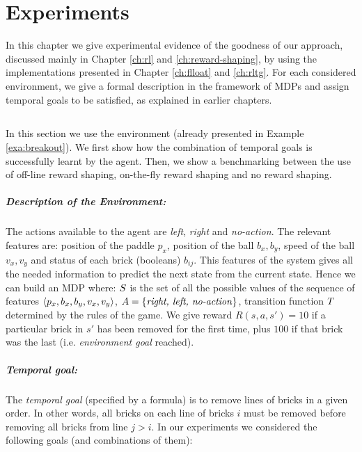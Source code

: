 \chapter{Experiments}\label{ch:experiments}

In this chapter we give experimental evidence of the goodness of our approach, discussed mainly in Chapter \ref{ch:rl} and \ref{ch:reward-shaping}, by using the implementations presented in Chapter \ref{ch:flloat} and \ref{ch:rltg}. For each considered environment, we give a formal description in the framework of MDPs and assign temporal goals to be satisfied, as explained in earlier chapters.
\section{\Breakout}
In this section we use the \Breakout environment (already presented in Example \ref{exa:breakout}). We first show how the combination of temporal goals is successfully learnt by the agent. Then, we show a benchmarking between the use of off-line reward shaping, on-the-fly reward shaping and no reward shaping.
\paragraph{Description of the Environment:}
The actions available to the agent are \emph{left}, \emph{right} and \emph{no-action}. The relevant features are: position of the paddle $p_x$, position of the ball $b_x, b_y$, speed of the ball $v_x, v_y$ and status of each brick (booleans) $b_{ij}$. This features of the system gives all the needed information to predict the next state from the current state. Hence we can build an MDP where: $S$ is the set of  all the possible values of the sequence of features $\langle p_x, b_x, b_y, v_x, v_y \rangle$, $A = \{\text{\emph{right, left, no-action}}\}$, transition function $T$ determined by the rules of the game. We give reward $R(s,a,s')=10$ if a particular brick in $s'$ has been removed for the first time, plus $100$ if that brick was the last (i.e. \emph{environment goal} reached).

\paragraph{Temporal goal:} The \emph{temporal goal} (specified by a \LLf formula) is to remove lines of bricks in a given order. In other words, all bricks on each line of bricks $i$ must be removed before removing all bricks from line $j > i$.
In our experiments we considered the following goals (and combinations of them):

